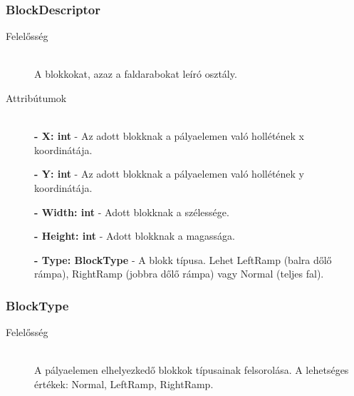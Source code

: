 \subsubsection{BlockDescriptor}
	\begin{description}
		\item[Felelősség] \hfill \\
		A blokkokat, azaz a faldarabokat leíró osztály.

		\item[Attribútumok] \hfill \\
		\textbf{- X: int} - Az adott blokknak a pályaelemen való hollétének x koordinátája.

		\textbf{- Y: int} - Az adott blokknak a pályaelemen való hollétének y koordinátája.

		\textbf{- Width: int} - Adott blokknak a szélessége.

		\textbf{- Height: int} - Adott blokknak a magassága.

		\textbf{- Type: BlockType} - A blokk típusa. Lehet LeftRamp (balra dőlő rámpa), RightRamp (jobbra dőlő rámpa) vagy Normal (teljes fal).

	\end{description}
	
\subsubsection{BlockType}
	\begin{description}
		\item[Felelősség] \hfill \\
		A pályaelemen elhelyezkedő blokkok típusainak felsorolása. A lehetséges értékek: Normal, LeftRamp, RightRamp.

	\end{description}
	
